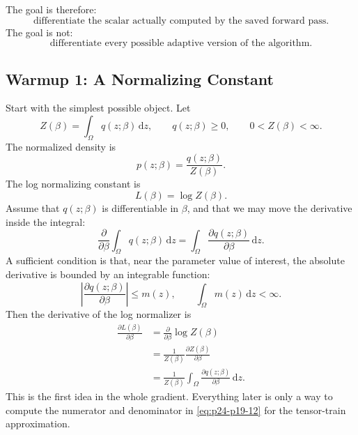 \documentclass[11pt]{article}
\numberwithin{equation}{section}
\newcommand{\dd}{\,\mathrm d}
\begin{document}
The goal is therefore:
\begin{equation}
    \text{differentiate the scalar actually computed by the saved forward pass.}
    \label{eq:p24-p19-5}
\end{equation}
The goal is not:
\begin{equation}
    \text{differentiate every possible adaptive version of the algorithm.}
    \label{eq:p24-p19-6}
\end{equation}

\subsection{Warmup 1: A Normalizing Constant}

Start with the simplest possible object.  Let
\begin{equation}
    Z(\beta)=\int_\Omega q(z;\beta)\dd z,
    \qquad
    q(z;\beta)\ge 0,
    \qquad
    0<Z(\beta)<\infty.
    \label{eq:p24-p19-7}
\end{equation}
The normalized density is
\begin{equation}
    p(z;\beta)=\frac{q(z;\beta)}{Z(\beta)}.
    \label{eq:p24-p19-8}
\end{equation}
The log normalizing constant is
\begin{equation}
    L(\beta)=\log Z(\beta).
    \label{eq:p24-p19-9}
\end{equation}
Assume that \(q(z;\beta)\) is differentiable in \(\beta\), and that we may move
the derivative inside the integral:
\begin{equation}
    \frac{\partial}{\partial\beta}
    \int_\Omega q(z;\beta)\dd z
    =
    \int_\Omega
    \frac{\partial q(z;\beta)}{\partial\beta}\dd z.
    \label{eq:p24-p19-10}
\end{equation}
A sufficient condition is that, near the parameter value of interest, the
absolute derivative is bounded by an integrable function:
\begin{equation}
    \left|
    \frac{\partial q(z;\beta)}{\partial\beta}
    \right|
    \le m(z),
    \qquad
    \int_\Omega m(z)\dd z<\infty.
    \label{eq:p24-p19-11}
\end{equation}
Then the derivative of the log normalizer is
\begin{equation}
\begin{aligned}
    \frac{\partial L(\beta)}{\partial\beta}
    &=
    \frac{\partial}{\partial\beta}\log Z(\beta)\\
    &=
    \frac{1}{Z(\beta)}
    \frac{\partial Z(\beta)}{\partial\beta}\\
    &=
    \frac{1}{Z(\beta)}
    \int_\Omega
    \frac{\partial q(z;\beta)}{\partial\beta}\dd z.
\end{aligned}
\label{eq:p24-p19-12}
\end{equation}
This is the first idea in the whole gradient.  Everything later is only a way
to compute the numerator and denominator in \eqref{eq:p24-p19-12} for the tensor-train
approximation.
\end{document}
